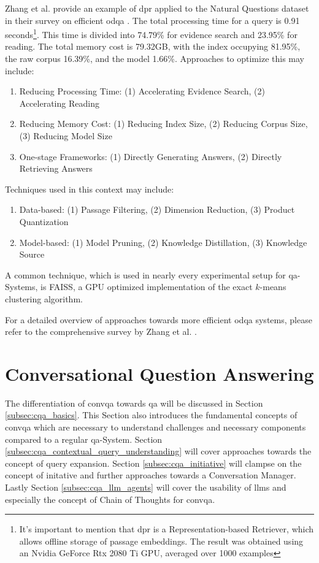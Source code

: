 Zhang et al. provide an example of \gls{dpr} applied to the Natural Questions dataset in their survey on efficient \gls{odqa} \cite{zhang_survey_2023}. The total processing time for a query is 0.91 seconds\footnote{It's important to mention that \gls{dpr} is a Representation-based Retriever, which allows offline storage of passage embeddings. The result was obtained using an Nvidia GeForce Rtx 2080 Ti GPU, averaged over 1000 examples}. This time is divided into 74.79\% for evidence search and 23.95\% for reading. The total memory cost is 79.32GB, with the index occupying 81.95\%, the raw corpus 16.39\%, and the model 1.66\%. Approaches to optimize this may include:

\begin{enumerate}
    \item Reducing Processing Time: (1) Accelerating Evidence Search, (2) Accelerating Reading
    \item Reducing Memory Cost: (1) Reducing Index Size, (2) Reducing Corpus Size, (3) Reducing Model Size
    \item One-stage Frameworks: (1) Directly Generating Answers, (2) Directly Retrieving Answers
\end{enumerate}

Techniques used in this context may include:

\begin{enumerate}
    \item Data-based: (1) Passage Filtering, (2) Dimension Reduction, (3) Product Quantization
    \item Model-based: (1) Model Pruning, (2) Knowledge Distillation, (3) Knowledge Source 
\end{enumerate}

A common technique, which is used in nearly every experimental setup for \gls{qa}-Systems, is FAISS\cite{johnson_billion-scale_2017}, a GPU optimized implementation of the exact $k$-means clustering algorithm.

For a detailed overview of approaches towards more efficient \gls{odqa} systems, please refer to the comprehensive survey by Zhang et al. \cite{zhang_survey_2023}.


\section{Conversational Question Answering}
\label{sec:cqa}

The differentiation of \gls{convqa} towards \gls{qa} will be discussed in Section \ref{subsec:cqa_basics}. This Section also introduces the fundamental concepts of \gls{convqa} which are necessary to understand challenges and necessary components compared to a regular \gls{qa}-System. Section \ref{subsec:cqa_contextual_query_understanding} will cover approaches towards the concept of query expansion. Section \ref{subsec:cqa_initiative} will clampse on the concept of initative and further approaches towards a Conversation Manager. Lastly Section \ref{subsec:cqa_llm_agents} will cover the usability of \gls{llm}s and especially the concept of Chain of Thoughts for \gls{convqa}.

